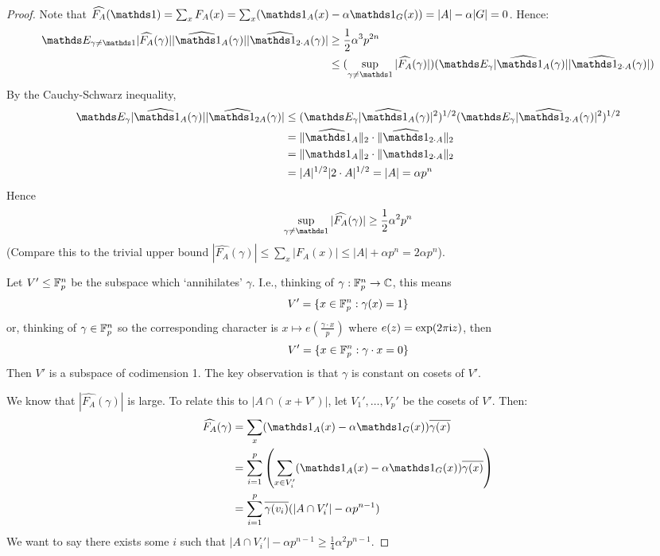 \documentclass[10pt,a4paper]{article}
\begin{document}
\begin{proof}
  Note that $\hat{F_A}(\one) = \sum_x F_A(x) = \sum_x (\one_A(x)-\alpha \one_G(x)) = |A| - \alpha |G| = 0$. Hence:
  \begin{align*}
    \E_{\gamma \neq \one} |\hat{F_A}(\gamma)||\hat{\one_A}(\gamma)||\hat{\one_{2\cdot A}}(\gamma)| &\geq \frac{1}{2}\alpha^3 p^{2n} \\
    &\leq (\sup_{\gamma \neq \one} |\hat{F_A}(\gamma)|)(\E_\gamma |\hat{\one_A}(\gamma)||\hat{\one_{2\cdot A}}(\gamma)|)
  \end{align*}
  By the Cauchy-Schwarz inequality,
  \begin{align*}
    \E_\gamma |\hat{\one_A}(\gamma)||\hat{\one_{2A}}(\gamma)| &\leq (\E_\gamma |\hat{\one_A}(\gamma)|^2)^{1/2}(\E_\gamma|\hat{\one_{2\cdot A}}(\gamma)|^2)^{1/2}\\
    &= \norm{\hat{\one_A}}_2 \cdot \norm{\hat{\one}_{2\cdot A}}_2 \\
    &= \norm{\one_A}_2 \cdot \norm{\one_{2\cdot A}}_2 \\
    &= |A|^{1/2} |2\cdot A|^{1/2} = |A| = \alpha p^n
  \end{align*}
  Hence
  \[\sup_{\gamma \neq \one}|\hat{F_A}(\gamma)| \geq \frac{1}{2}\alpha^2 p^n\]
  (Compare this to the trivial upper bound $|\hat{F_A}(\gamma)| \leq \sum_x |F_A(x)| \leq |A|+\alpha p^n = 2\alpha p^n$).

  Let $V' \leq \mathbb{F}_p^n$ be the subspace which `annihilates' $\gamma$. I.e., thinking of $\gamma:\mathbb{F}_p^n \to \mathbb{C}$, this means
  \[V' = \{x \in \mathbb{F}_p^n : \gamma(x) = 1\}\]
  or, thinking of $\gamma \in \mathbb{F}_p^n$ so the corresponding character is $x \mapsto e\left(\frac{\gamma\cdot x}{p}\right)$ where $e(z) = \exp(2\pi\mathfrak{i} z)$, then
  \[V' = \{x \in \mathbb{F}_p^n : \gamma \cdot x = 0\}\]
  Then $V'$ is a subspace of codimension 1. The key observation is that $\gamma$ is constant on cosets of $V'$.

  We know that $|\hat{F_A}(\gamma)|$ is large. To relate this to $|A\cap (x+ V')|$, let $V_1', \ldots, V_p'$ be the cosets of $V'$. Then:
  \begin{align*}
    \hat{F_A}(\gamma) &= \sum_x(\one_A(x)-\alpha \one_G(x)) \overline{\gamma(x)}\\
    &= \sum_{i=1}^p\left( \sum_{x \in V_i'}(\one_A(x)-\alpha \one_G(x))\overline{\gamma(x)}\right)\\
    &= \sum_{i=1}^p \overline{\gamma(v_i)}(|A\cap V_i'| - \alpha p^{n-1})
  \end{align*}
  We want to say there exists some $i$ such that $|A\cap V_i'| - \alpha p^{n-1} \geq \frac{1}{4}\alpha^2 p^{n-1}$.


\end{proof}
\end{document}
